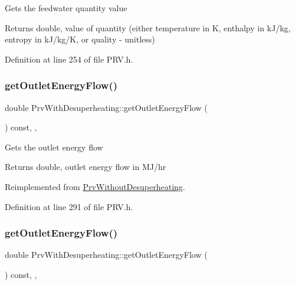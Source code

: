 Gets the feedwater quantity value

\begin{DoxyReturn}{Returns}
double, value of quantity (either temperature in K, enthalpy in k\+J/kg, entropy in k\+J/kg/K, or quality -\/ unitless) 
\end{DoxyReturn}


Definition at line 254 of file P\+R\+V.\+h.

\mbox{\label{class_prv_with_desuperheating_a2394fb62e4fc85252fc4eb15f08e9f1e}} 
\subsubsection{\texorpdfstring{get\+Outlet\+Energy\+Flow()}{getOutletEnergyFlow()}\hspace{0.1cm}{\footnotesize\ttfamily [1/3]}}
{\footnotesize\ttfamily double Prv\+With\+Desuperheating\+::get\+Outlet\+Energy\+Flow (\begin{DoxyParamCaption}{ }\end{DoxyParamCaption}) const\hspace{0.3cm}{\ttfamily [inline]}, {\ttfamily [override]}, {\ttfamily [virtual]}}

Gets the outlet energy flow \begin{DoxyReturn}{Returns}
double, outlet energy flow in M\+J/hr 
\end{DoxyReturn}


Reimplemented from \hyperlink{class_prv_without_desuperheating_a6529a68ffa444ae87c890b2bcbc2cc84}{Prv\+Without\+Desuperheating}.



Definition at line 291 of file P\+R\+V.\+h.

\mbox{\label{class_prv_with_desuperheating_a2394fb62e4fc85252fc4eb15f08e9f1e}} 
\subsubsection{\texorpdfstring{get\+Outlet\+Energy\+Flow()}{getOutletEnergyFlow()}\hspace{0.1cm}{\footnotesize\ttfamily [2/3]}}
{\footnotesize\ttfamily double Prv\+With\+Desuperheating\+::get\+Outlet\+Energy\+Flow (\begin{DoxyParamCaption}{ }\end{DoxyParamCaption}) const\hspace{0.3cm}{\ttfamily [inline]}, {\ttfamily [override]}, {\ttfamily [virtual]}}

